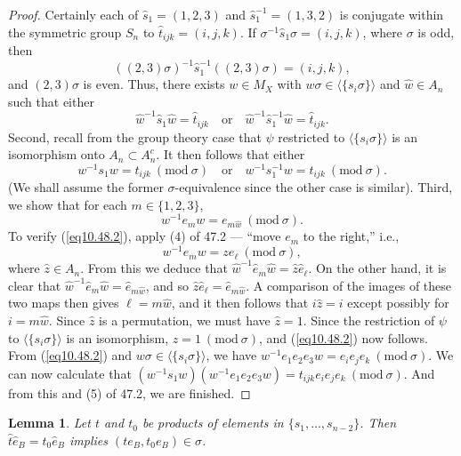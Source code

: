 \documentclass{surv-l}
\numberwithin{equation}{section}
\numberwithin{table}{section}
\numberwithin{figure}{section}
\theoremstyle{plain}
\newtheorem{lemma}[equation]{Lemma}
\theoremstyle{definition}
\begin{document}
\begin{proof}Certainly each of $\widehat{s}_{1}=(1,2,3)$ and
$\widehat{s}_{1}^{-1}=(1,3,2)$ is conjugate within the symmetric
group $S_{n}$ to $\widehat{t}_{ijk}=(i,j, k)$. If
$\sigma^{-1}\widehat{s}_{1}\sigma=(i, j, k)$, where $\sigma$ is
odd, then
\[
((2,3)\sigma)^{-1}\widehat{s}_{1}^{-1}((2,3)\sigma)=(i,j, k),
\]
and $(2,3)\sigma$ is even. Thus, there exists $w\in M_{X}$ with $
w\sigma\in\langle\{s_{i}\sigma\}\rangle$ and $\widehat{w}\in
A_{n}$ such that either
\[
\widehat{w}^{-1}\widehat{s}_{1}\widehat{w}=\widehat{t}_{ijk}\quad \mathrm{or}\quad \widehat{w}^{-1}
\widehat{s}_{1}^{-1}\widehat{w}=\widehat{t}_{ijk}.
\]
Second, recall from the group theory case that $\psi$ restricted
to $\langle\{s_{i}\sigma\}\rangle$ is an isomorphism onto
$A_{n}\subset A_{n}^{c}$. It then follows that either
\[
w^{-1}s_{1}w=t_{ijk}\ (\mathrm{mod}\ \sigma)\quad \mathrm{or}\quad w^{-1}s_{1}^{-1}w=t_{ijk}\ (\mathrm{mod}\ \sigma).
\]
(We shall assume the former $\sigma$-equivalence since the other
case is similar). Third, we show that for each $m\in\{1,2,3\}$,
\begin{equation}\label{eq10.48.2}
 w^{-1}e_{m}w=e_{m\widehat{w}}\ (\mathrm{mod}\ \sigma).
\end{equation}
To verify (\ref{eq10.48.2}), apply (4) of 47.2 --- ``move $e_{m}$
to the right,'' i.e.,
\[
w^{-1}e_{m}w=ze_{\ell}\ (\mathrm{mod}\ \sigma),
\]
where $\widehat{z}\in A_{n}$. From this we deduce that
$\widehat{w}^{-1}\widehat{e}_{m}\widehat{w}=\widehat{z}\widehat{e}_{\ell}$.
On the other hand, it is clear that
$\widehat{w}^{-1}\widehat{e}_{m}\widehat{w}=\widehat{e}_{m\widehat{w}}$,
and so $\widehat{z}\widehat{e}_{\ell}=\widehat{e}_{m\widehat{w}}$.
A comparison of the images of these two maps then gives
$\ell=m\widehat{w}$, and it then follows that $i\widehat{z}=i$
except possibly for $i=m\widehat{w}$. Since $\widehat{z}$ is a
permutation, we must have $\widehat{z}=1$. Since the restriction
of $\psi$ to $\langle\{s_{i}\sigma\}\rangle$ is an isomorphism,
$z=1\ (\mathrm{mod}\ \sigma)$, and (\ref{eq10.48.2}) now follows.
From (\ref{eq10.48.2}) and
$w\sigma\in\langle\{s_{i}\sigma\}\rangle$, we have
$w^{-1}e_{1}e_{2}e_{3}w= e_{i}e_{j}e_{k}\ (\mathrm{mod}\ \sigma)$.
We can now calculate that $(w^{-1}s_{1}w)(w^{-1}e_{1}e_{2}e_{3}w)=
t_{ijk}e_{i}e_{j}e_{k}\ (\mathrm{mod}\ \sigma)$. And from this and
(5) of 47.2, we are finished.
\end{proof}

\begin{lemma}\label{lem10.48.3}
Let $t$ and $t_{0}$ be products of elements in $\{s_{1},\ldots,
s_{n-2}\}$. Then
$\widehat{t}\widehat{e}_{B}=\widehat{t}_{0}\widehat{e}_{B}$
implies $(te_{B}, t_{0}e_{B})\in\sigma$.
\end{lemma}
\end{document}
